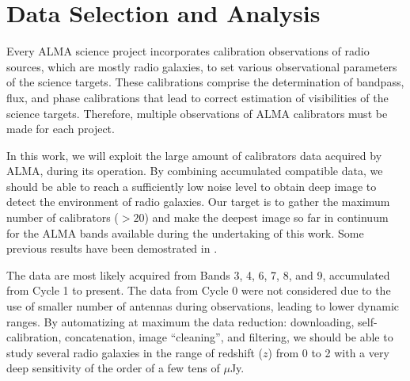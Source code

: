 \chapter{Data Selection and Analysis}

Every ALMA science project incorporates calibration observations of radio sources, which are mostly radio galaxies, to set various observational parameters of the science targets. These calibrations comprise the determination of bandpass, flux, and phase calibrations that lead to correct estimation of visibilities of the science targets. Therefore, multiple observations of ALMA calibrators must be made for each project.  

In this work, we will exploit the large amount of calibrators data acquired by ALMA, during its operation. By combining accumulated compatible data, we should be able to reach a sufficiently low noise level to obtain deep image to detect the environment of radio galaxies. Our target is to gather the maximum number of calibrators ($>20$) and make the deepest image so far in continuum for the ALMA bands available during the undertaking of this work. Some previous results have been demostrated in \cite{leon2016}.

The data are most likely acquired from Bands 3, 4, 6, 7, 8, and 9, accumulated from Cycle 1 to present. The data from Cycle 0 were not considered due to the use of smaller number of antennas during observations, leading to lower dynamic ranges. By automatizing at maximum the data reduction: downloading, self-calibration, concatenation, image ``cleaning'', and filtering, we should be able to study several radio galaxies in the range of redshift ($z$) from 0 to 2 with a very deep sensitivity of the order of a few tens of $\mu$Jy.


